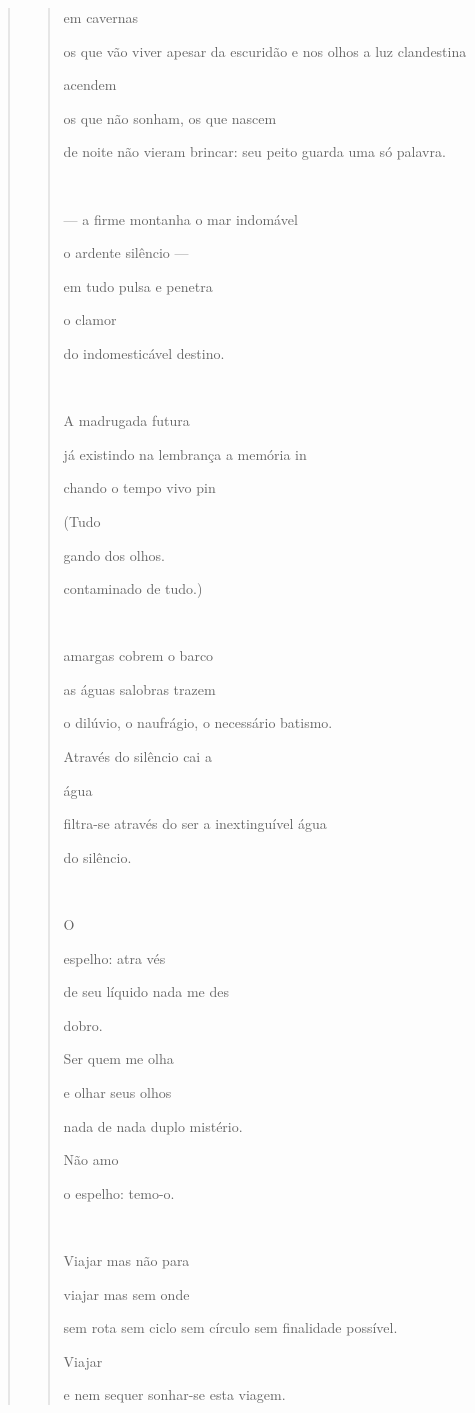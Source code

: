 \begin{verse}
\begin{quote}
em cavernas

os que vão viver apesar da escuridão e nos olhos a luz clandestina

acendem

os que não sonham, os que nascem

de noite não vieram brincar: seu peito guarda uma só palavra.

  

--- a firme montanha o mar indomável

o ardente silêncio ---

em tudo pulsa e penetra

o clamor

do indomesticável destino.



A madrugada futura

já existindo na lembrança a memória in

chando o tempo vivo pin

(Tudo

gando dos olhos.

contaminado de tudo.)



amargas cobrem o barco

as águas salobras trazem

o dilúvio, o naufrágio, o necessário batismo.

Através do silêncio cai a

água

filtra-se através do ser a inextinguível água

do silêncio.

 

O

espelho: atra vés

de seu líquido nada me des

dobro.

Ser quem me olha

e olhar seus olhos

nada de nada duplo mistério.

Não amo

o espelho: temo-o.



Viajar mas não para

viajar mas sem onde

sem rota sem ciclo sem círculo sem finalidade possível.

Viajar

e nem sequer sonhar-se esta viagem.
\end{quote}


\end{verse}
